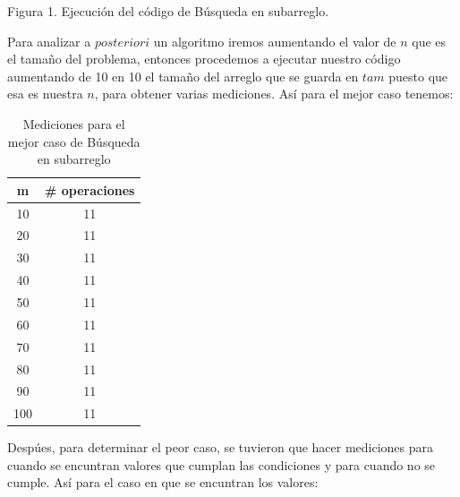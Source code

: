 \documentclass[12pt,twoside]{article}
\begin{document}
\vspace{-1cm}
\begin{center}
    Figura 1. Ejecuci\'on del c\'odigo de B\'usqueda en subarreglo.
\end{center}
\medskip
Para analizar a $posteriori$ un algoritmo iremos aumentando el valor de $n$ que es el tamaño del problema, entonces procedemos a ejecutar nuestro c\'odigo aumentando de 10 en 10 el tamaño del arreglo que se guarda en $tam$ puesto que esa es nuestra $n$, para obtener varias mediciones.
\newline
\newline
As\'i para el mejor caso tenemos:
\begin{table}[htbp]
    \begin{center}
        \begin{tabular}{|c|c|}
            \hline
            \textbf{m} & \textbf{\# operaciones} \\
            \hline \hline
            10 &	11 \\ \hline
            20 &11 \\ \hline
            30 &	11 \\ \hline
            40 &	11 \\ \hline
            50 &	11 \\ \hline
            60 &	11 \\ \hline
            70 & 11 \\ \hline
            80 & 11 \\ \hline
            90 & 11 \\ \hline
            100 & 11 \\ \hline
        \end{tabular}
        \caption{Mediciones para el mejor caso de B\'usqueda en subarreglo}
        \label{tabla:analisis1}
    \end{center}
\end{table}
\medskip
\newline
Desp\'ues, para determinar el peor caso, se tuvieron que hacer mediciones para cuando se encuntran valores que cumplan las condiciones y para cuando no se cumple.
\newpage
As\'i para el caso en que se encuntran los valores:
\end{document}
